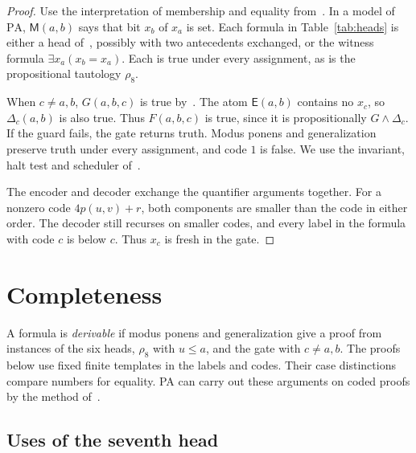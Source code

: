 \documentclass[11pt,letterpaper]{article}
\newcommand{\PA}{\mathrm{PA}}
\newcommand{\Mc}{\mathsf{M}}
\newcommand{\Ec}{\mathsf{E}}
\begin{document}
\begin{proof}
Use the interpretation of membership and equality
from~\cite[\S4.2]{pa209}. In a model of $\PA$, $\Mc(a,b)$ says that
bit $x_b$ of $x_a$ is set. Each formula in Table~\ref{tab:heads} is
either a head of~\cite{pa209}, possibly with two antecedents exchanged,
or the witness formula $\exists x_a(x_b=x_a)$. Each is true under every
assignment, as is the propositional tautology $\rho_8$.

When $c\ne a,b$, $G(a,b,c)$ is true by~\cite{pa209}. The atom
$\Ec(a,b)$ contains no $x_c$, so $\Delta_c(a,b)$ is also true. Thus
$F(a,b,c)$ is true, since it is propositionally $G\wedge\Delta_c$.
If the guard fails, the gate returns truth. Modus ponens and
generalization preserve truth under every assignment, and code $1$
is false. We use the invariant, halt test and scheduler
of~\cite[\S4.2]{pa209}.

The encoder and decoder exchange the quantifier arguments together.
For a nonzero code $4p(u,v)+r$, both components are smaller than the
code in either order. The decoder still recurses on smaller codes, and
every label in the formula with code $c$ is below $c$. Thus $x_c$ is
fresh in the gate.
\end{proof}

\section{Completeness}\label{sec:complete}

A formula is \emph{derivable} if modus ponens and generalization give
a proof from instances of the six heads, $\rho_8$ with $u\le a$, and
the gate with $c\ne a,b$. The proofs below use fixed finite templates
in the labels and codes. Their case distinctions compare numbers
for equality. PA can carry out these arguments on coded proofs by the
method of~\cite[\S6.1]{pa209}.

\subsection{Uses of the seventh head}
\end{document}
